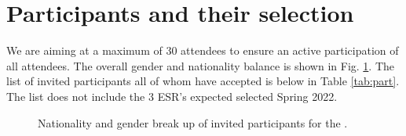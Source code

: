 \section{Participants and their selection}

We are aiming at a maximum of 30 attendees to ensure an active
participation of all attendees. The overall gender and nationality
balance is shown in Fig. \ref{fig:country}. The list of invited
participants all of whom have accepted is below in Table
\ref{tab:part}. The list does not include the 3 ESR's expected 
selected Spring 2022.

\begin{figure}[!htb]
  \centering 
  \caption{Nationality and gender break up of invited participants for
    the \sympe.}
  \label{fig:country}
\end{figure}







